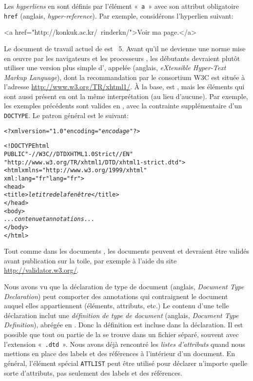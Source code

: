 Les \emph{hyperliens} en \HTML sont définis par l'élément «~\texttt{a}~»
avec son attribut obligatoire \texttt{href}
(anglais, \emph{hyper-reference}). Par exemple, considérons
l'hyperlien suivant:
\begin{sverb}
<a href="http://konkuk.ac.kr/~rinderkn/">Voir ma page.</a>
\end{sverb}


\mypar{\XHTML}

Le document de travail actuel de \HTML est \HTML~\textsf{5}. Avant
qu'il ne devienne une norme mise en {\oe}uvre par les navigateurs et
les processeurs \XSLT, les débutants devraient plutôt utiliser une
version plus simple d'\HTML, appelée \XHTML (anglais, \emph{eXtensible
  Hyper-Text Markup Language}), dont la recommandation par le
consortium W3C est située à l'adresse
\url{http://www.w3.org/TR/xhtml1/}. À la base, \XHTML est \XML, mais
les éléments qui sont aussi présent en \HTML ont la même
interprétation (au lieu d'aucune). Par exemple, les exemples
précédents sont valides en \XHTML, avec la contrainte supplémentaire
d'un \texttt{DOCTYPE}. Le patron général est le suivant:
\begin{alltt}
\small<?xml version="1.0" encoding="\emph{encodage}"?>

<!DOCTYPE html
    PUBLIC "-//W3C//DTD XHTML 1.0 Strict//EN"
    "http://www.w3.org/TR/xhtml1/DTD/xhtml1-strict.dtd">
<html xmlns="http://www.w3.org/1999/xhtml"
      xml:lang="fr" lang="fr">
  <head>
    <title>\textit{le titre de la fenêtre}</title>
  </head>
  <body>
     \emph{...contenu et annotations...}
  </body>
</html>
\end{alltt}
Tout comme dans les documents \XML, les documents \XHTML peuvent et
devraient être validés avant publication sur la toile, par exemple à
l'aide du site \url{http://validator.w3.org/}.

\mypar{\DTD}

Nous avons vu  que la déclaration de type
de document (anglais, \emph{Document Type Declaration}) peut comporter
des annotations qui contraignent le document \XML auquel elles
appartiennent (éléments, attributs, etc.) Le contenu d'une telle
déclaration inclut une \emph{définition de type de document} (anglais,
\emph{Document Type Definition}), abrégée en \DTD. Donc la définition
est incluse dans la déclaration. Il est possible que tout ou partie de
la \DTD se trouve dans un fichier séparé, souvent avec l'extension
«~\texttt{.dtd}~». Nous avons déjà rencontré les \emph{listes
  d'attributs}  quand nous mettions en
place des labels et des références à l'intérieur d'un document. En
général, l'élément spécial \texttt{ATTLIST} peut être utilisé pour
déclarer n'importe quelle sorte d'attributs, pas seulement des labels
et des références.

